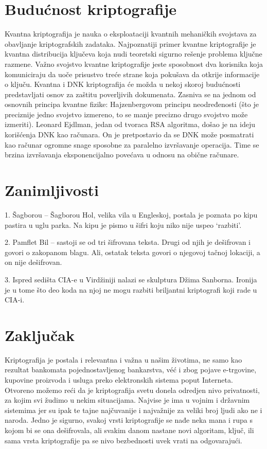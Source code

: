 \documentclass[a4paper]{article}
\begin{document}
\section{Budućnost kriptografije}
\label{sec:budućnost_kriptografije}
Kvantna kriptografija je nauka o eksploataciji kvantnih mehaničkih svojstava za obavljanje kriptografskih zadataka. Najpoznatiji primer kvantne kriptografije je kvantna distribucija ključeva koja nudi teoretski sigurno rešenje problema ključne razmene. Važno svojstvo kvantne kriptografije jeste sposobnost dva korisnika koja komuniciraju da uoče prisustvo treće strane koja pokušava da otkrije informacije o ključu.
Kvantna i DNK kriptografija će možda u nekoj skoroj budućnosti predstavljati osnov za zaštitu poverljivih dokumenata. Zasniva se na jednom od osnovnih principa kvantne fizike: Hajzenbergovom principu neodređenosti (što je preciznije jedno svojstvo izmereno, to se manje precizno drugo svojstvo može izmeriti). Leonard Ejdlman, jedan od tvoraca RSA algoritma, došao je na ideju korišćenja DNK kao računara. On je pretpostavio da se DNK može posmatrati kao računar ogromne snage sposobne za paralelno izvršavanje operacija. Time se brzina izvršavanja eksponencijalno povećava u odnosu na obične računare.

\section{Zanimljivosti}
\label{sec:zanimljivosti}

1. Šagborou – Šagborou Hol, velika vila u Engleskoj, postala je poznata po kipu pastira u uglu parka. Na kipu je pismo u šifri
koju niko nije uspeo ‘razbiti’.

2. Pamflet Bil – sastoji se od tri šifrovana teksta. Drugi od njih je dešifrovan i govori o zakopanom blagu. Ali, ostatak teksta govori o njegovoj tačnoj lokaciji, a on nije dešifrovan.

3. Ispred sedišta CIA-e u Virdžiniji nalazi se skulptura Džima Sanborna. Ironija je u tome što deo koda na njoj ne mogu razbiti briljantni kriptografi koji rade u CIA-i.

\section{Zaključak}
\label{sec:zaključak}
Kriptografija je postala i relevantna i važna u našim životima, ne samo kao rezultat bankomata pojednostavljenog bankarstva, véć i zbog pojave e-trgovine, kupovine proizvoda i usluga preko elektronskih sistema poput Interneta.
Otvoreno možemo reći da je kriptografija svetu donela odredjen nivo privatnosti, za kojim svi žudimo u nekim situacijama. Najvise je ima u vojnim i državnim sistemima jer su ipak te tajne najčuvanije i najvažnije za veliki broj ljudi ako ne i naroda. Jedno je sigurno, svakoj vrsti kriptografije se nađe neka mana i rupa s kojom bi se ona dešifrovala, ali
svakim danom nastane novi algoritam, ključ, ili sama vrsta kriptografije pa se nivo bezbednosti uvek vrati na odgovarajući.
\end{document}
